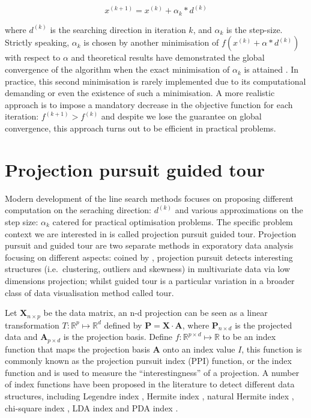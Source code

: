\documentclass[12pt]{article}
\begin{document}
\begin{equation}
x^{(k + 1)} = x^{(k)} + \alpha_k* d^{(k)}
\label{eq:line-search}
\end{equation}

where \(d^{(k)}\) is the searching direction in iteration \(k\), and
\(\alpha_k\) is the step-size. Strictly speaking, \(\alpha_k\) is chosen
by another minimisation of \(f(x^{(k)} + \alpha* d^{(k)})\) with respect
to \(\alpha\) and theoretical results have demonstrated the global
convergence of the algorithm when the exact minimisation of \(\alpha_k\)
is attained \citep{curry1944method}. In practice, this second
minimisation is rarely implemented due to its computational demanding or
even the existence of such a minimisation. A more realistic approach is
to impose a mandatory decrease in the objective function for each
iteration: \(f^{(k+1)}> f^{(k)}\) and despite we lose the guarantee on
global convergence, this approach turns out to be efficient in practical
problems.

\newpage

\hypertarget{tour}{%
\section{Projection pursuit guided tour}\label{tour}}

Modern development of the line search methods focuses on proposing
different computation on the seraching direction: \(d^{(k)}\) and
various approximations on the step size: \(\alpha_k\) catered for
practical optimisation problems. The specific problem context we are
interested in is called projection pursuit guided tour. Projection
pursuit and guided tour are two separate methods in exporatory data
analysis focusing on different aspects: coined by
\citet{friedman1974projection}, projection pursuit detects interesting
structures (i.e.~clustering, outliers and skewness) in multivariate data
via low dimensions projection; whilst guided tour is a particular
variation in a broader class of data visualisation method called tour.

Let \(\mathbf{X}_{n \times p}\) be the data matrix, an n-d projection
can be seen as a linear transformation
\(T: \mathbb{R}^p \mapsto \mathbb{R}^d\) defined by
\(\mathbf{P} = \mathbf{X} \cdot \mathbf{A}\), where
\(\mathbf{P}_{n \times d}\) is the projected data and
\(\mathbf{A}_{p\times d}\) is the projection basis. Define
\(f: \mathbb{R}^{p \times d} \mapsto \mathbb{R}\) to be an index
function that maps the projection basis \(\mathbf{A}\) onto an index
value \(I\), this function is commonly known as the projection pursuit
index (PPI) function, or the index function and is used to measure the
``interestingness'' of a projection. A number of index functions have
been proposed in the literature to detect different data structures,
including Legendre index \citep{friedman1974projection}, Hermite index
\citep{hall1989polynomial}, natural Hermite index
\citep{cook1993projection}, chi-square index
\citep{posse1995projection}, LDA index \citep{lee2005projection} and PDA
index \citep{lee2010projection}.
\end{document}
